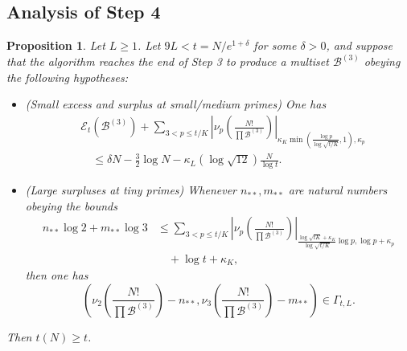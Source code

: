 \documentclass[12pt,a4paper,reqno]{amsart}
\numberwithin{equation}{section}
\theoremstyle{plain}
\newtheorem{proposition}[theorem]{Proposition}
\theoremstyle{definition}
\newcommand\tuple{{\mathcal B}}
\newcommand\excess{{\mathcal{E}}}
\begin{document}
\subsection{Analysis of Step 4}

\begin{proposition}\label{step4-reduce}  Let $L \geq 1$.  Let $9L < t = N/e^{1+\delta}$ for some $\delta>0$, and suppose that the algorithm reaches the end of Step 3 to produce a multiset $\tuple^{(3)}$ obeying the following hypotheses:
  \begin{itemize}
  \item[(i)] (Small excess and surplus at small/medium primes) One has
\begin{equation}\label{new-balance-5}
    \begin{split}
&      \excess_t(\tuple^{(3)}) + \sum_{3 < p \leq t/K}
   \left|\nu_p\left(\frac{N!}{\prod \tuple^{(3)}}\right)\right|_{\kappa_K \min(\frac{\log p}{\log\sqrt{t/K}},1),\kappa_p}\\
&\quad    \leq \delta N - \frac{3}{2} \log N - \kappa_L (\log \sqrt{12}) \frac{N}{\log t}.
    \end{split}
  \end{equation}
  \item[(ii)] (Large surpluses at tiny primes) 
  Whenever $n_{**}, m_{**}$ are natural numbers obeying the bounds
  \begin{equation}\label{nstarb}
    \begin{split}
   n_{**} \log 2 + m_{**} \log 3 &\leq 
    \sum_{3 < p \leq t/K}
    \left|\nu_p\left(\frac{N!}{\prod \tuple^{(3)}}\right)\right|_{\frac{\log \sqrt{tK} + \kappa_K}{\log\sqrt{t/K}} \log p,\log p+\kappa_p}\\
  &\quad  + \log t + \kappa_K,
  \end{split}
\end{equation}
    then one has
  \begin{equation}\label{sector}\left( \nu_2\left(\frac{N!}{\prod \tuple^{(3)}}\right) - n_{**}, \nu_3\left(\frac{N!}{\prod \tuple^{(3)}}\right) - m_{**}\right) \in \Gamma_{t,L}.
  \end{equation}
  \end{itemize}
     Then $t(N) \geq t$.
\end{proposition}
\end{document}
